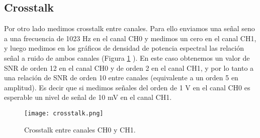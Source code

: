 \documentclass[a4paper, 11pt]{article}
\begin{document}
\subsection*{Crosstalk}
Por otro lado medimos crosstalk entre canales. Para ello enviamos una señal seno a una frecuencia de 1023 Hz en el canal CH0 y medimos un cero en el canal CH1, y luego medimos en los gráficos de densidad de potencia espectral las relación señal a ruido de ambos canales (Figura \ref{fig:crosstalk} ). En este caso obtenemos un valor de SNR de orden 12 en el canal CH0 y de orden 2 en el canal CH1,  y por lo tanto a una relación de SNR de orden 10 entre canales (equivalente a un orden 5 en amplitud).  Es decir que si medimos señales del orden de 1 V en el canal CH0 es esperable un nivel de señal de 10 mV en el canal CH1.

\begin{figure} [H]
\centering
\texttt{[image: crosstalk.png]}
\caption{Crosstalk entre canales CH0 y CH1. \label{fig:crosstalk}}
\end{figure} 












%
\end{document}
